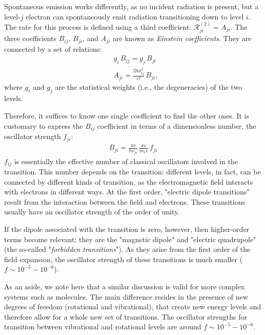 Spontaneous emission works differently, as no incident radiation is present, but a level-$j$ electron can spontaneously emit radiation transitioning down to level $i$. The rate for this process is defined using a third coefficient: $\mathcal{R}_{ji}^{(2)} = A_{ji}$. The three coefficients $B_{ij}$, $B_{ji}$, and $A_{ji}$ are known as \textit{Einstein coefficients}. They are connected by a set of relations:
\begin{subequations}
\begin{align}
    &g_i\,B_{ij} = g_j\,B_{ji}\\
    &A_{ji} = \frac{2h\nu_{ij}^3}{c^2}\,B_{ji},
\end{align}
\label{eq:einstein_coeff}
\end{subequations}
where $g_i$ and $g_j$ are the statistical weights (i.e., the degeneracies) of the two levels. 

Therefore, it suffices to know one single coefficient to find the other ones. It is customary to express the $B_{ij}$ coefficient in terms of a dimensionless number, the oscillator strength $f_{ji}$:
\begin{align}
    B_{ji} = \frac{4\pi}{h\nu_{ji}}\,\frac{\pi e}{m_e c} \,f_{ji} 
\end{align}
$f_{ij}$ is essentially the effective number of classical oscillators involved in the transition. This number depends on the transition: different levels, in fact, can be connected by different kinds of transition, as the electromagnetic field interacts with electrons in different ways. At the first order, "electric dipole transitions" result from the interaction between the field and electrons. These transitions usually have an oscillator strength of the order of unity. 

If the dipole associated with the transition is zero, however, then higher-order terms become relevant: they are the "magnetic dipole" and "electric quadrupole" (the so-called "\textit{forbidden transitions}"). As they arise from the first order of the field expansion, the oscillator strength of these transitions is much smaller ($f\sim10^{-5}-10^{-8}$). 

As an aside, we note here that a similar discussion is valid for more complex systems such as molecules. The main difference resides in the presence of new degrees of freedom (rotational and vibrational), that create new energy levels and therefore allow for a whole new set of transitions. The oscillator strengths for transition between vibrational and rotational levels are around $f\sim 10^{-5}-10^{-6}$.

